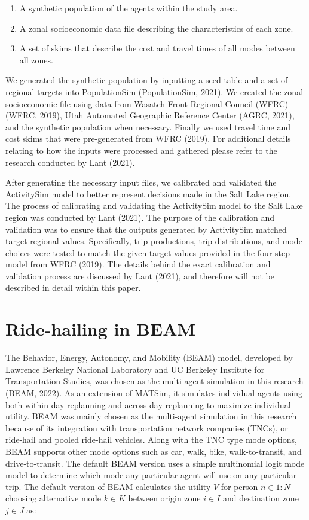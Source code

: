 \documentclass[fancy, masters]{byuthesis}
\providecommand{\tightlist}{%
  \setlength{\itemsep}{0pt}\setlength{\parskip}{0pt}}
\begin{document}
\begin{enumerate}
\def\labelenumi{\arabic{enumi}.}
\tightlist
\item
  A synthetic population of the agents within the study area.
\item
  A zonal socioeconomic data file describing the characteristics of each zone.
\item
  A set of skims that describe the cost and travel times of all modes between all zones.
\end{enumerate}

We generated the synthetic population by inputting a seed table and a set of regional targets into PopulationSim (PopulationSim, 2021). We created the zonal socioeconomic file using data from Wasatch Front Regional Council (WFRC) (WFRC, 2019), Utah Automated Geographic Reference Center (AGRC, 2021), and the synthetic population when necessary. Finally we used travel time and cost skims that were pre-generated from WFRC (2019). For additional details relating to how the inputs were processed and gathered please refer to the research conducted by Lant (2021).

After generating the necessary input files, we calibrated and validated the ActivitySim model to better represent decisions made in the Salt Lake region. The process of calibrating and validating the ActivitySim model to the Salt Lake region was conducted by Lant (2021). The purpose of the calibration and validation was to ensure that the outputs generated by ActivitySim matched target regional values. Specifically, trip productions, trip distributions, and mode choices were tested to match the given target values provided in the four-step model from WFRC (2019). The details behind the exact calibration and validation process are discussed by Lant (2021), and therefore will not be described in detail within this paper.

\hypertarget{novel-beam}{%
\section{Ride-hailing in BEAM}\label{novel-beam}}

The Behavior, Energy, Autonomy, and Mobility (BEAM) model, developed by Lawrence Berkeley National Laboratory and UC Berkeley Institute for Transportation Studies, was chosen as the multi-agent simulation in this research (BEAM, 2022). As an extension of MATSim, it simulates individual agents using both within day replanning and across-day replanning to maximize individual utility. BEAM was mainly chosen as the multi-agent simulation in this research because of its integration with transportation network companies (TNCs), or ride-hail and pooled ride-hail vehicles. Along with the TNC type mode options, BEAM supports other mode options such as car, walk, bike, walk-to-transit, and drive-to-transit. The default BEAM version uses a simple multinomial logit mode model to determine which mode any particular agent will use on any particular trip. The default version of BEAM calculates the utility \(V\) for person \(n \in {1:N}\) choosing alternative mode \(k \in K\) between origin zone \(i \in I\) and destination zone \(j \in J\) as:
\end{document}
